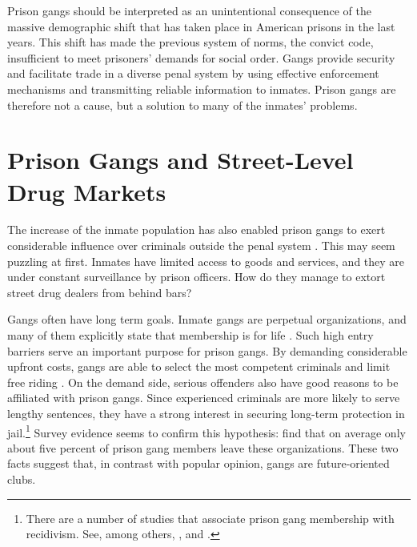 \documentclass[a4paper, 12pt]{article}
\begin{document}
Prison gangs should be interpreted as an unintentional consequence of the massive demographic shift that has taken place in American prisons in the last years. This shift has made the previous system of norms, the convict code, insufficient to meet prisoners' demands for social order. Gangs provide security and facilitate trade in a diverse penal system by using effective enforcement mechanisms and transmitting reliable information to inmates. Prison gangs are therefore not a cause, but a solution to many of the inmates' problems.

\section{Prison Gangs and Street-Level Drug Markets}
\label{sec:outside} 

\noindent
The increase of the inmate population has also enabled prison gangs to exert considerable influence over criminals outside the penal system \citep{bony2015prison,dias2011pulverizaccao,lessing2014build,skarbek2011governance,valdez2005mexican}. This may seem puzzling at first. Inmates have limited access to goods and services, and they are under constant surveillance by prison officers. How do they manage to extort street drug dealers from behind bars?

Gangs often have long term goals. Inmate gangs are perpetual organizations, and many of them explicitly state that membership is for life \citep{blatchford2008black,mendoza2005mexican}. Such high entry barriers serve an important purpose for prison gangs. By demanding considerable upfront costs, gangs are able to select the most competent criminals and limit free riding \citep[p. 704]{freire2014entering,skarbek2011governance}. On the demand side, serious offenders also have good reasons to be affiliated with prison gangs. Since experienced criminals are more likely to serve lengthy sentences, they have a strong interest in securing long-term protection in jail.\footnote{There are a number of studies that associate prison gang membership with recidivism. See, among others,  \citet{fleisher2001going}, \citet{huebner2007gangs} and \citet{olson2004relationship}.} Survey evidence seems to confirm this hypothesis: \citet{fong1995blood} find that on average only about five percent of prison gang members leave these organizations. These two facts suggest that, in contrast with popular opinion, gangs are future-oriented clubs. 
\end{document}
